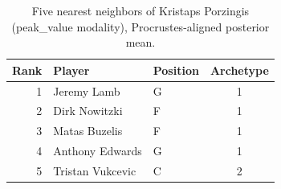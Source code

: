 \begin{table}[htbp]
  \centering\small
  \begin{tabular}{rllc}
    \toprule
    Rank & Player & Position & Archetype \\
    \midrule
    1 & Jeremy Lamb & G & 1 \\
    2 & Dirk Nowitzki & F & 1 \\
    3 & Matas Buzelis & F & 1 \\
    4 & Anthony Edwards & G & 1 \\
    5 & Tristan Vukcevic & C & 2 \\
    \bottomrule
  \end{tabular}
  \caption{Five nearest neighbors of Kristaps Porzingis (peak_value modality), Procrustes-aligned posterior mean.}
  \label{tab:Kristaps_Porzingis_neighbors_peak_value}
\end{table}

